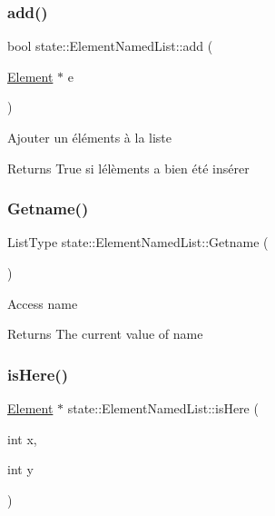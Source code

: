 \subsubsection{\texorpdfstring{add()}{add()}}
{\footnotesize\ttfamily bool state\+::\+Element\+Named\+List\+::add (\begin{DoxyParamCaption}\item[{\hyperlink{classstate_1_1_element}{Element} $\ast$}]{e }\end{DoxyParamCaption})}

Ajouter un éléments à la liste \begin{DoxyReturn}{Returns}
True si l\textquotesingle{}élèments a bien été insérer 
\end{DoxyReturn}
\mbox{\label{classstate_1_1_element_named_list_a7a85fde8e5274020221ef1f521b9d2ea}} 
\subsubsection{\texorpdfstring{Getname()}{Getname()}}
{\footnotesize\ttfamily List\+Type state\+::\+Element\+Named\+List\+::\+Getname (\begin{DoxyParamCaption}{ }\end{DoxyParamCaption})\hspace{0.3cm}{\ttfamily [inline]}}

Access name \begin{DoxyReturn}{Returns}
The current value of name 
\end{DoxyReturn}
\mbox{\label{classstate_1_1_element_named_list_acd3748ad2d2f1d593f0c79508f067641}} 
\subsubsection{\texorpdfstring{is\+Here()}{isHere()}}
{\footnotesize\ttfamily \hyperlink{classstate_1_1_element}{Element} $\ast$ state\+::\+Element\+Named\+List\+::is\+Here (\begin{DoxyParamCaption}\item[{int}]{x,  }\item[{int}]{y }\end{DoxyParamCaption})}

